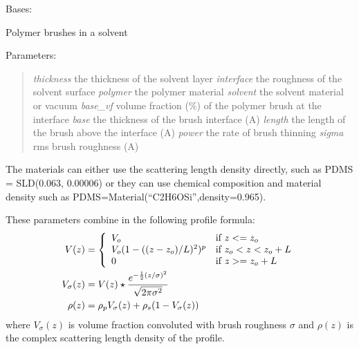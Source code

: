 \documentclass[letterpaper,10pt,english]{sphinxmanual}
\begin{document}
\begin{fulllineitems}
\label{api/polymer:refl1d.polymer.PolymerBrush}
Bases: {\hyperref[api/model:refl1d.model.Layer]{}}

Polymer brushes in a solvent

Parameters:
\begin{quote}

\emph{thickness} the thickness of the solvent layer
\emph{interface} the roughness of the solvent surface
\emph{polymer} the polymer material
\emph{solvent} the solvent material or vacuum
\emph{base\_vf} volume fraction (\%) of the polymer brush at the interface
\emph{base} the thickness of the brush interface (A)
\emph{length} the length of the brush above the interface (A)
\emph{power} the rate of brush thinning
\emph{sigma} rms brush roughness (A)
\end{quote}

The materials can either use the scattering length density directly,
such as PDMS = SLD(0.063, 0.00006) or they can use chemical composition
and material density such as PDMS=Material(``C2H6OSi'',density=0.965).

These parameters combine in the following profile formula:
\begin{gather}
\begin{split}V(z) &= \left\{
  \begin{array}{ll}
    V_o                        & \mbox{if } z <= z_o \\
    V_o (1 - ((z-z_o)/L)^2)^p  & \mbox{if } z_o < z < z_o + L \\
    0                          & \mbox{if } z >= z_o + L
  \end{array}
\right. \\
V_\sigma(z)
   &= V(z) \star
         \frac{e^{-\frac{1}{2}(z/\sigma)^2}}{\sqrt{2\pi\sigma^2}} \\
\rho(z) &= \rho_p V_\sigma(z) + \rho_s (1-V_\sigma(z))\end{split}\notag
\end{gather}
where $V_\sigma(z)$ is volume fraction convoluted with brush
roughness $\sigma$ and $\rho(z)$ is the complex scattering
length density of the profile.


\end{fulllineitems}
\end{document}
